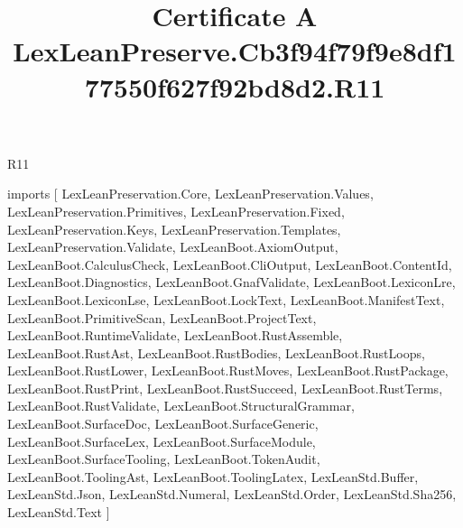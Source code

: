 \begin{lexlean}{R11}
\title{Certificate A LexLeanPreserve.Cb3f94f79f9e8df177550f627f92bd8d2.R11}
\begin{coremodule}
imports [
  LexLeanPreservation.Core,
  LexLeanPreservation.Values,
  LexLeanPreservation.Primitives,
  LexLeanPreservation.Fixed,
  LexLeanPreservation.Keys,
  LexLeanPreservation.Templates,
  LexLeanPreservation.Validate,
  LexLeanBoot.AxiomOutput,
  LexLeanBoot.CalculusCheck,
  LexLeanBoot.CliOutput,
  LexLeanBoot.ContentId,
  LexLeanBoot.Diagnostics,
  LexLeanBoot.GnafValidate,
  LexLeanBoot.LexiconLre,
  LexLeanBoot.LexiconLse,
  LexLeanBoot.LockText,
  LexLeanBoot.ManifestText,
  LexLeanBoot.PrimitiveScan,
  LexLeanBoot.ProjectText,
  LexLeanBoot.RuntimeValidate,
  LexLeanBoot.RustAssemble,
  LexLeanBoot.RustAst,
  LexLeanBoot.RustBodies,
  LexLeanBoot.RustLoops,
  LexLeanBoot.RustLower,
  LexLeanBoot.RustMoves,
  LexLeanBoot.RustPackage,
  LexLeanBoot.RustPrint,
  LexLeanBoot.RustSucceed,
  LexLeanBoot.RustTerms,
  LexLeanBoot.RustValidate,
  LexLeanBoot.StructuralGrammar,
  LexLeanBoot.SurfaceDoc,
  LexLeanBoot.SurfaceGeneric,
  LexLeanBoot.SurfaceLex,
  LexLeanBoot.SurfaceModule,
  LexLeanBoot.SurfaceTooling,
  LexLeanBoot.TokenAudit,
  LexLeanBoot.ToolingAst,
  LexLeanBoot.ToolingLatex,
  LexLeanStd.Buffer,
  LexLeanStd.Json,
  LexLeanStd.Numeral,
  LexLeanStd.Order,
  LexLeanStd.Sha256,
  LexLeanStd.Text
]


\end{coremodule}
\end{lexlean}
